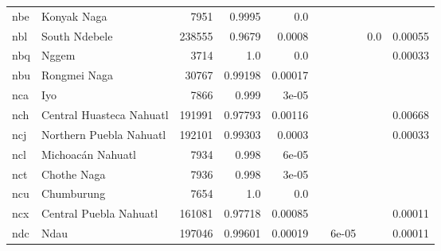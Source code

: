 \documentclass[11pt]{article}
\begin{document}
\begin{table*}[h]
{\begin{tabular}{llrrrrrrr}
nbe         & Konyak Naga         & 7951         & 0.9995         & 0.0         &          &          &          &          \\

nbl         & South Ndebele         & 238555         & 0.9679         & 0.0008         &          &          & 0.0         & 0.00055         \\

nbq         & Nggem         & 3714         & 1.0         & 0.0         &          &          &          & 0.00033         \\

nbu         & Rongmei Naga         & 30767         & 0.99198         & 0.00017         &          &          &          &          \\

nca         & Iyo         & 7866         & 0.999         & 3e-05         &          &          &          &          \\

nch         & Central Huasteca Nahuatl         & 191991         & 0.97793         & 0.00116         &          &          &          & 0.00668         \\

ncj         & Northern Puebla Nahuatl         & 192101         & 0.99303         & 0.0003         &          &          &          & 0.00033         \\

ncl         & Michoacán Nahuatl         & 7934         & 0.998         & 6e-05         &          &          &          &          \\

nct         & Chothe Naga         & 7936         & 0.998         & 3e-05         &          &          &          &          \\

ncu         & Chumburung         & 7654         & 1.0         & 0.0         &          &          &          &          \\

ncx         & Central Puebla Nahuatl         & 161081         & 0.97718         & 0.00085         &          &          &          & 0.00011         \\

ndc         & Ndau         & 197046         & 0.99601         & 0.00019         &          & 6e-05         &          & 0.00011         \\


\end{tabular}}
\end{table*}
\end{document}
